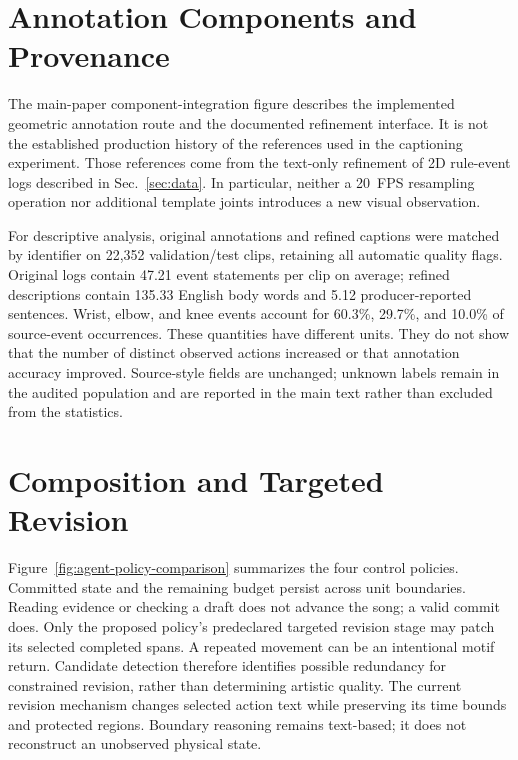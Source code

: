 \section{Annotation Components and Provenance}
\label{sec:annotation-details}

The main-paper component-integration figure describes the implemented geometric
annotation route and the documented refinement interface. It is not
the established production history of the references used in the
captioning experiment. Those references come from the text-only
refinement of 2D rule-event logs described in Sec.~\ref{sec:data}.
In particular, neither a 20~FPS resampling operation nor additional
template joints introduces a new visual observation.

For descriptive analysis, original annotations and refined captions
were matched by identifier on 22,352 validation/test clips, retaining
all automatic quality flags. Original logs contain 47.21 event
statements per clip on average; refined descriptions contain 135.33
English body words and 5.12 producer-reported sentences. Wrist, elbow,
and knee events account for 60.3\%, 29.7\%, and 10.0\% of source-event
occurrences. These quantities have different units. They do not show
that the number of distinct observed actions increased or that
annotation accuracy improved. Source-style fields are unchanged;
unknown labels remain in the audited population and are reported in
the main text rather than excluded from the statistics.

\section{Composition and Targeted Revision}
\label{sec:revision-details}



Figure~\ref{fig:agent-policy-comparison} summarizes the four control
policies. Committed state and the remaining budget persist across unit
boundaries. Reading evidence or checking a draft does not advance the
song; a valid commit does. Only the proposed policy's predeclared
targeted revision stage may patch its selected completed spans.
A repeated movement can be an intentional
motif return. Candidate detection therefore identifies possible
redundancy for constrained revision, rather than determining artistic
quality. The current revision mechanism changes selected action text
while preserving its time bounds and protected regions. Boundary
reasoning remains text-based; it does not reconstruct an unobserved
physical state.

